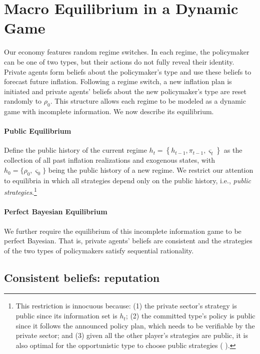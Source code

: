 \documentclass[12pt,letter,leqno]{article}
\theoremstyle{asn}
\theoremstyle{lem}
\theoremstyle{slem}
\theoremstyle{prop}
\theoremstyle{appprop}
\theoremstyle{rem}
\theoremstyle{defn}
\begin{document}
\section{Macro Equilibrium in a Dynamic Game}
Our economy features random regime switches. In each regime, the policymaker can be one of two types, but their actions do not fully reveal their identity. Private agents form beliefs about the policymaker’s type and use these beliefs to forecast future inflation. Following a regime switch, a new inflation plan is initiated and private agents' beliefs about the new policymaker's type are reset randomly to $\rho_0$. This structure allows each regime to be modeled as a dynamic game with incomplete information. We now describe its equilibrium.

\paragraph{Public Equilibrium}
Define the public history of the current regime $h_{t}=\left \{ h_{t-1},\pi _{t-1},\varsigma_{t}\right \} $ as the collection of all past inflation realizations and exogenous states, with $h_0=\{\rho_{0},\varsigma_0\}$ being the public history of a new regime. We restrict our attention to equilibria in which
all strategies depend only on the public history, i.e.,
\textit{public strategies}.\footnote{This restriction is innocuous because: (1) the
private sector's strategy is public since its information set is $h_{t}$; (2) the committed type's policy is public
since it follows the announced policy plan, which needs to be verifiable by
the private sector; and (3) given all the other player's strategies are public,
it is also optimal for the opportunistic type to choose public strategies (%
\cite{mailath_repeated_2006}).}  

\paragraph{Perfect Bayesian Equilibrium}
We further require the equilibrium of this incomplete information game to be perfect Bayesian. That is, private agents' beliefs are consistent
and the strategies of the two types of policymakers satisfy sequential
rationality.

\subsection{Consistent beliefs: reputation}
\end{document}
